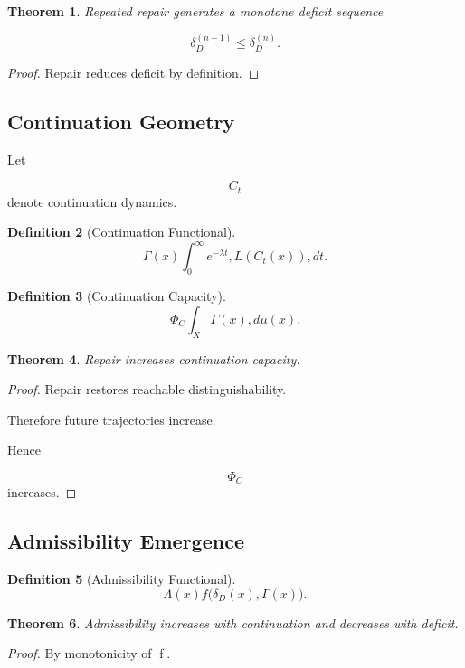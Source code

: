 \documentclass[12pt]{article}
\newtheorem{theorem}{Theorem}[section]
\newtheorem{definition}[theorem]{Definition}
\theoremstyle{remark}
\begin{document}
\begin{theorem}
Repeated repair generates a monotone deficit sequence

\[
\delta_D^{(n+1)}
\le
\delta_D^{(n)}.
\]
\end{theorem}
\begin{proof}
Repair reduces deficit by definition.
\end{proof}

\subsection{Continuation Geometry}

Let

\[
C_t
\]
denote continuation dynamics.

\begin{definition}[Continuation Functional]
\[
\Gamma(x)
\int_0^\infty
e^{-\lambda t}
,
L(C_t(x))
,dt.
\]
\end{definition}

\begin{definition}[Continuation Capacity]
\[
\Phi_C
\int_X
\Gamma(x)
,d\mu(x).
\]
\end{definition}

\begin{theorem}
Repair increases continuation capacity.
\end{theorem}

\begin{proof}
Repair restores reachable distinguishability.

Therefore future trajectories increase.

Hence

\[
\Phi_C
\]
increases.
\end{proof}

\subsection{Admissibility Emergence}

\begin{definition}[Admissibility Functional]
\[
\Lambda(x)
f
\big(
\delta_D(x),
\Gamma(x)
\big).
\]
\end{definition}

\begin{theorem}
Admissibility increases with continuation and decreases with deficit.
\end{theorem}

\begin{proof}
By monotonicity of f.
\end{proof}
\end{document}
